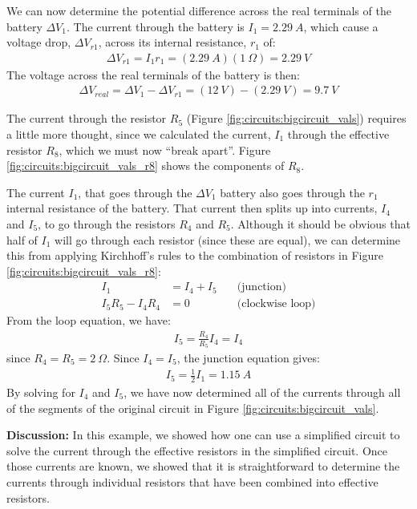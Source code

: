 \begin{example}
We can now determine the potential difference across the real terminals of the battery $\Delta V_1$. The current through the battery is $I_1=\SI{2.29}{A}$, which cause a voltage drop, $\Delta V_{r1}$, across its internal resistance, $r_1$ of:
\begin{align*}
\Delta V_{r1}=I_1r_1=(\SI{2.29}{A})(\SI{1}{\Omega})=\SI{2.29}{V}
\end{align*} 
The voltage across the real terminals of the battery is then:
\begin{align*}
\Delta V_{real}=\Delta V_1-\Delta V_{r1}=(\SI{12}{V})-(\SI{2.29}{V})=\SI{9.7}{V}
\end{align*}

The current through the resistor $R_5$ (Figure \ref{fig:circuits:bigcircuit_vals}) requires a little more thought, since we calculated the current, $I_1$ through the effective resistor $R_8$, which we must now ``break apart''. Figure \ref{fig:circuits:bigcircuit_vals_r8} shows the components of $R_8$. 


The current $I_1$, that goes through the $\Delta V_1$ battery also goes through the $r_1$ internal resistance of the battery. That current then splits up into currents, $I_4$ and $I_5$, to go through the resistors $R_4$ and $R_5$. Although it should be obvious that half of $I_1$ will go through each resistor (since these are equal), we can determine this from applying Kirchhoff's rules to the combination of resistors in Figure \ref{fig:circuits:bigcircuit_vals_r8}:
\begin{align*}
I_1&=I_4+I_5 \quad&\text{(junction)}\\
I_5R_5-I_4R_4&=0\quad&\text{(clockwise loop)}
\end{align*}
From the loop equation, we have:
\begin{align*}
I_5=\frac{R_4}{R_5}I_4=I_4
\end{align*}
since $R_4=R_5=\SI{2}{\Omega}$. Since $I_4=I_5$, the junction equation gives:
\begin{align*}
I_5=\frac{1}{2}I_1=\SI{1.15}{A}
\end{align*}
By solving for $I_4$ and $I_5$, we have now determined all of the currents through all of the segments of the original circuit in Figure \ref{fig:circuits:bigcircuit_vals}.

\textbf{Discussion: }In this example, we showed how one can use a simplified circuit to solve the current through the effective resistors in the simplified circuit. Once those currents are known, we showed that it is straightforward to determine the currents through individual resistors that have been combined into effective resistors.  
\end{example}
